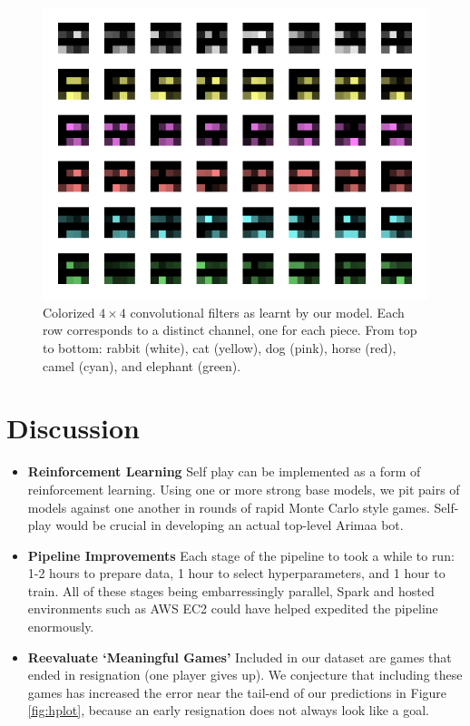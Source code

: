 \documentclass{article}
\begin{document}
\begin{figure}[ht]
\centering
\includegraphics[scale=.5]{assets/figure-filters.png}
\caption{Colorized $4\times 4$ convolutional filters as learnt by our model.  Each row corresponds to a distinct channel, one for each piece.  From top to bottom: rabbit (white), cat (yellow), dog (pink), horse (red), camel (cyan), and elephant (green). }
\end{figure}

\section{Discussion}

\begin{itemize}
\item \textbf{Reinforcement Learning} Self play can be implemented as a form of reinforcement learning.  Using one or more strong base models, we pit pairs of models against one another in rounds of rapid Monte Carlo style games.  Self-play would be crucial in developing an actual top-level Arimaa bot.

\item \textbf{Pipeline Improvements} Each stage of the pipeline to took a while to run:  1-2 hours to prepare data, 1 hour to select hyperparameters, and 1 hour to train.  All of these stages being embarressingly parallel, Spark \cite{spark} and hosted environments such as AWS EC2 could have helped expedited the pipeline enormously.

\item \textbf{Reevaluate `Meaningful Games'} Included in our dataset are games that ended in resignation (one player gives up).  We conjecture that including these games has increased the error near the tail-end of our predictions in Figure \ref{fig:hplot}, because an early resignation does not always look like a goal.
\end{itemize}
\end{document}
